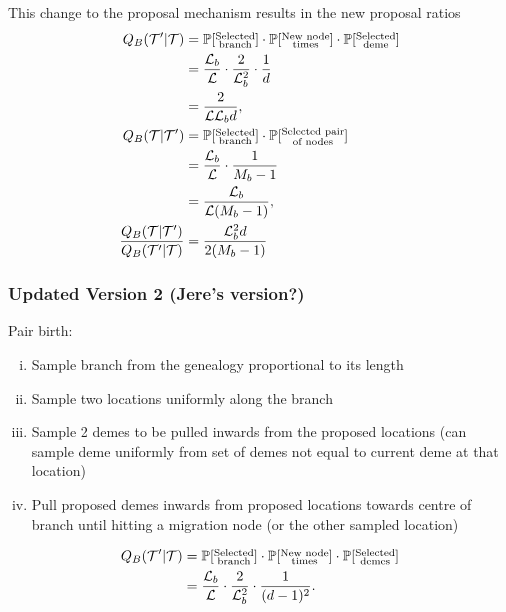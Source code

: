 	This change to the proposal mechanism results in the new proposal ratios
	\begin{align*}
		Q_B(\mathcal{T}' | \mathcal{T}) & = \mathbb{P}[ \substack{\text{Selected} \\ \text{branch}}] \cdot \mathbb{P}[ \substack{\text{New node} \\ \text{times}}] \cdot \mathbb{P}[\substack{\text{Selected} \\ \text{deme}}] \\
		& = \frac{\mathcal{L}_b}{\mathcal{L}} \cdot \frac{2}{\mathcal{L}_b^2} \cdot \frac{1}{d} \\
		& = \frac{2}{\mathcal{L} \mathcal{L}_b d}, \\
		Q_B (\mathcal{T} | \mathcal{T}') & = \mathbb{P}[\substack{\text{Selected} \\ \text{branch}}] \cdot \mathbb{P}[\substack{\text{Selected pair} \\ \text{of nodes}}] \\
		& = \frac{\mathcal{L}_b}{\mathcal{L}} \cdot \frac{1}{M_b - 1} \\
		& = \frac{\mathcal{L}_b}{\mathcal{L} (M_b - 1)}, \\
		\frac{Q_B (\mathcal{T} | \mathcal{T}')}{Q_B (\mathcal{T}' | \mathcal{T})} & = \frac{\mathcal{L}_b ^2 d}{2(M_b - 1)}
	\end{align*}

\subsubsection{Updated Version 2 (Jere's version?)}
	Pair birth:
	\begin{enumerate}[(i)]
		\item Sample branch from the genealogy proportional to its length
		\item Sample two locations uniformly along the branch
		\item Sample 2 demes to be pulled inwards from the proposed locations (can sample deme uniformly from set of demes not equal to current deme at that location)
		\item Pull proposed demes inwards from proposed locations towards centre of branch until hitting a migration node (or the other sampled location)
	\end{enumerate}
	
	\begin{align*}
		Q_B (\mathcal{T}' | \mathcal{T}) & = \mathbb{P}[\substack{\text{Selected} \\ \text{branch}}] \cdot \mathbb{P}[\substack{\text{New node} \\ \text{times}}] \cdot \mathbb{P}[\substack{\text{Selected} \\ \text{demes}}] \\
		& = \frac{\mathcal{L}_b}{\mathcal{L}} \cdot \frac{2}{\mathcal{L}_b^2} \cdot \frac{1}{(d-1)^2}.
	\end{align*}
	
